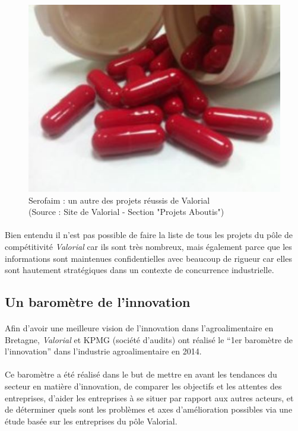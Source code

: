\documentclass[a4paper,12pt]{report}
\begin{document}
		\begin{figure}[!h]
			\centering
			\includegraphics[scale=0.5]{Illustrations/Serofaim.jpg}
			\caption{Serofaim : un autre des projets réussis de Valorial\\(Source : Site de Valorial - Section "Projets Aboutis"\cite{ProjetsAboutis})}
			\label{Serofaim}
			\end{figure}		

				\paragraph{}Bien entendu il n’est pas possible de faire la liste de tous les projets du pôle de compétitivité \textit{Valorial} car ils sont très nombreux, mais également parce que les informations sont maintenues confidentielles avec beaucoup de rigueur car elles sont hautement stratégiques dans un contexte de concurrence industrielle.

		\subsection{Un baromètre de l'innovation}
			
		    \paragraph{}Afin d’avoir une meilleure vision de l’innovation dans l’agroalimentaire en Bretagne, \textit{Valorial} et KPMG (société d’audits) ont réalisé le “1er baromètre de l’innovation” dans l’industrie agroalimentaire en 2014. 

    	\paragraph{}Ce baromètre a été réalisé dans le but de mettre en avant les tendances du secteur en matière d’innovation, de comparer les objectifs et les attentes des entreprises, d’aider les entreprises à se situer par rapport aux autres acteurs, et de déterminer quels sont les problèmes et axes d’amélioration possibles via une étude basée sur les entreprises du pôle Valorial.
\end{document}
